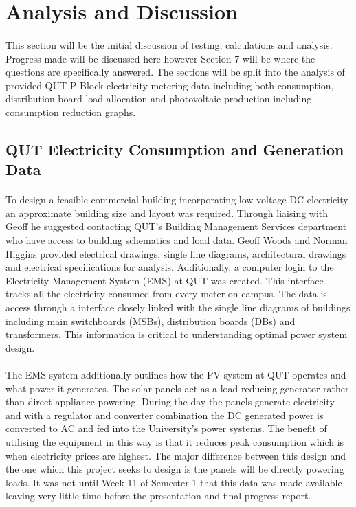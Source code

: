 
\section{Analysis and Discussion}

\paragraph{}
This section will be the initial discussion of testing, calculations and analysis. Progress made will be discussed here however Section 7 will be where the questions are specifically answered. The sections will be split into the analysis of provided QUT P Block electricity metering data including both consumption, distribution board load allocation and photovoltaic production including consumption reduction graphs.   


\subsection{QUT Electricity Consumption and Generation Data}

\paragraph{}
To design a feasible commercial building incorporating low voltage DC electricity an approximate building size and layout was required. Through liaising with Geoff he suggested contacting QUT's Building Management Services department who have access to building schematics and load data. Geoff Woods and Norman Higgins provided electrical drawings, single line diagrams, architectural drawings and electrical specifications for analysis. Additionally, a computer login to the Electricity Management System (EMS) at QUT was created. This interface tracks all the electricity consumed from every meter on campus. The data is access through a interface closely linked with the single line diagrams of buildings including main switchboards (MSBs), distribution boards (DBs) and transformers. This information is critical to understanding optimal power system design.  

\paragraph{}
The EMS system additionally outlines how the PV system at QUT operates and what power it generates. The solar panels act as a load reducing generator rather than direct appliance powering. During the day the panels generate electricity and with a regulator and converter combination the DC generated power is converted to AC and fed into the University's power systems. The benefit of utilising the equipment in this way is that it reduces peak consumption which is when electricity prices are highest. The major difference between this design and the one which this project seeks to design is the panels will be directly powering loads. It was not until Week 11 of Semester 1 that this data was made available leaving very little time before the presentation and final progress report.

\newpage